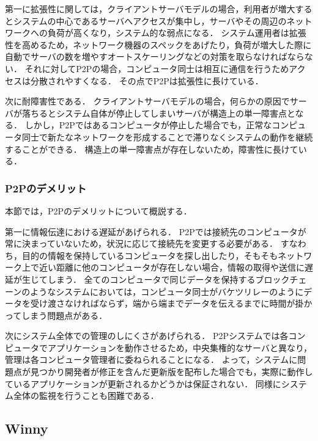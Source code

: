 第一に拡張性に関しては，クライアントサーバモデルの場合，利用者が増大するとシステムの中心であるサーバへアクセスが集中し，サーバやその周辺のネットワークへの負荷が高くなり，システム的な弱点になる．
システム運用者は拡張性を高めるため，ネットワーク機器のスペックをあげたり，負荷が増大した際に自動でサーバの数を増やすオートスケーリングなどの対策を取らなければならない．
それに対してP2Pの場合，コンピュータ同士は相互に通信を行うためアクセスは分散されやすくなる．
その点でP2Pは拡張性に長けている．

次に耐障害性である．
クライアントサーバモデルの場合，何らかの原因でサーバが落ちるとシステム自体が停止してしまいサーバが構造上の単一障害点となる．
しかし，P2Pではあるコンピュータが停止した場合でも，正常なコンピュータ同士で新たなネットワークを形成することで滞りなくシステムの動作を継続することができる．
構造上の単一障害点が存在しないため，障害性に長けている．

\subsubsection{P2Pのデメリット}

本節では，P2Pのデメリットについて概説する．

第一に情報伝達における遅延があげられる．
P2Pでは接続先のコンピュータが常に決まっていないため，状況に応じて接続先を変更する必要がある．
すなわち，目的の情報を保持しているコンピュータを探し出したり，そもそもネットワーク上で近い距離に他のコンピュータが存在しない場合，情報の取得や送信に遅延が生じてしまう．
全てのコンピュータで同じデータを保持するブロックチェーンのようなシステムにおいては，コンピュータ同士がバケツリレーのようにデータを受け渡さなければならず，端から端までデータを伝えるまでに時間が掛かってしまう問題点がある．

次にシステム全体での管理のしにくさがあげられる．
P2Pシステムでは各コンピュータでアプリケーションを動作させるため，中央集権的なサーバと異なり，管理は各コンピュータ管理者に委ねられることになる．
よって，システムに問題点が見つかり開発者が修正を含んだ更新版を配布した場合でも，実際に動作しているアプリケーションが更新されるかどうかは保証されない．
同様にシステム全体の監視を行うことも困難である．

\subsection{Winny}

